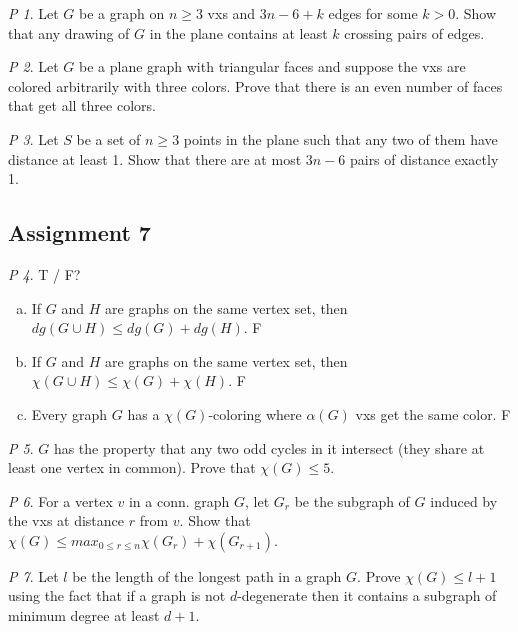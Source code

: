 \documentclass[11pt, fleqn, a4paper, landscape]{article}
\theoremstyle{plain} %
\theoremstyle{remark} %
\newtheorem{problem}{P}
\theoremstyle{definition} %
\begin{document}
\begin{multicols}{5}
\begin{problem}
Let $G$ be a graph on $n\ge 3$ vxs and $3n- 6 + k$ edges for some $k > 0$. Show that any drawing of $G$ in the plane contains at least $k$ crossing pairs of edges.
\end{problem}

\begin{problem}
Let $G$ be a plane graph with triangular faces and suppose the vxs are colored arbitrarily with three colors. Prove that there is an even number of faces that get all three colors.
\end{problem}

\begin{problem}
Let $S$ be a set of $n\ge 3$ points in the plane such that any two of them have distance at least 1. Show that there are at most $3n - 6$ pairs of distance exactly 1.
\end{problem}

\subsection{Assignment 7}

\begin{problem}
T / F?
\begin{enumerate}[(a)]
\item If $G$ and $H$ are graphs on the same vertex set, then $dg(G \cup H)\le dg(G) + dg(H)$. F
\item If $G$ and $H$ are graphs on the same vertex set, then $\chi(G \cup H) \le \chi(G) + \chi(H)$. F
\item Every graph $G$ has a $\chi(G)$-coloring where $\alpha(G)$ vxs get the same color. F
\end{enumerate}
\end{problem}

\begin{problem}
$G$ has the property that any two odd cycles in it intersect (they share at least one vertex in common). Prove that $\chi(G) \le 5.$
\end{problem}

\begin{problem}
For a vertex $v$ in a conn. graph $G$, let $G_r$ be the subgraph of $G$ induced by the vxs at distance $r$ from $v$. Show that $\chi(G) \le max_{0\le r\le n}\chi(G_r) + \chi(G_{r+1})$.
\end{problem}

\begin{problem}
Let $l$ be the length of the longest path in a graph $G$. Prove $\chi(G)\le l + 1$ using the fact that if a graph is not $d$-degenerate then it contains a subgraph of minimum degree at least $d + 1$.
\end{problem}


\end{multicols}
\end{document}
